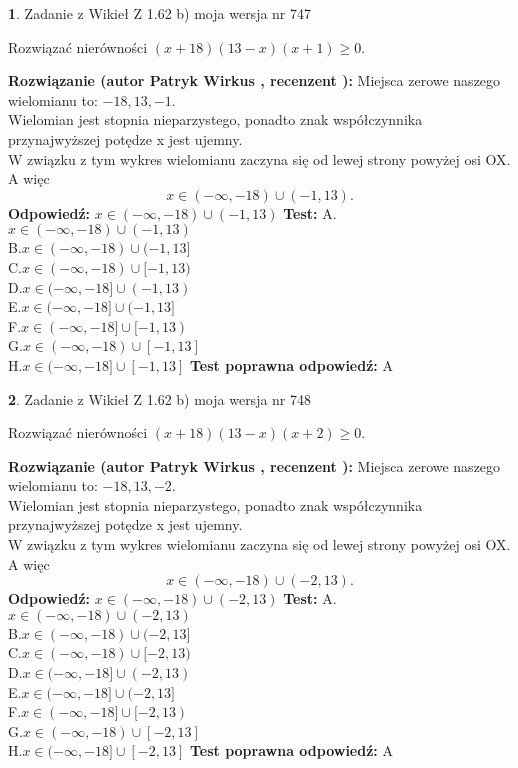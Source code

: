 \documentclass[12pt, a4paper]{article}
\theoremstyle{definition} %
\newtheorem{zad}{}
\newcommand{\zadStart}[1]{\begin{zad}#1\newline}
\newcommand{\zadStop}{\end{zad}}
\newcommand{\rozwStart}[2]{\noindent \textbf{Rozwiązanie (autor #1 , recenzent #2): }\newline}
\newcommand{\rozwStop}{\newline}
\newcommand{\odpStart}{\noindent \textbf{Odpowiedź:}\newline}
\newcommand{\odpStop}{\newline}
\newcommand{\testStart}{\noindent \textbf{Test:}\newline}
\newcommand{\testStop}{\newline}
\newcommand{\kluczStart}{\noindent \textbf{Test poprawna odpowiedź:}\newline}
\newcommand{\kluczStop}{\newline}
\begin{document}
\zadStart{Zadanie z Wikieł Z 1.62 b) moja wersja nr 747}

Rozwiązać nierówności $(x+18)(13-x)(x+1)\ge0$.
\zadStop
\rozwStart{Patryk Wirkus}{}
Miejsca zerowe naszego wielomianu to: $-18, 13, -1$.\\
Wielomian jest stopnia nieparzystego, ponadto znak współczynnika przy\linebreak najwyższej potędze x jest ujemny.\\ W związku z tym wykres wielomianu zaczyna się od lewej strony powyżej osi OX. A więc $$x \in (-\infty,-18) \cup (-1,13).$$
\rozwStop
\odpStart
$x \in (-\infty,-18) \cup (-1,13)$
\odpStop
\testStart
A.$x \in (-\infty,-18) \cup (-1,13)$\\
B.$x \in (-\infty,-18) \cup (-1,13]$\\
C.$x \in (-\infty,-18) \cup [-1,13)$\\
D.$x \in (-\infty,-18] \cup (-1,13)$\\
E.$x \in (-\infty,-18] \cup (-1,13]$\\
F.$x \in (-\infty,-18] \cup [-1,13)$\\
G.$x \in (-\infty,-18) \cup [-1,13]$\\
H.$x \in (-\infty,-18] \cup [-1,13]$
\testStop
\kluczStart
A
\kluczStop



\zadStart{Zadanie z Wikieł Z 1.62 b) moja wersja nr 748}

Rozwiązać nierówności $(x+18)(13-x)(x+2)\ge0$.
\zadStop
\rozwStart{Patryk Wirkus}{}
Miejsca zerowe naszego wielomianu to: $-18, 13, -2$.\\
Wielomian jest stopnia nieparzystego, ponadto znak współczynnika przy\linebreak najwyższej potędze x jest ujemny.\\ W związku z tym wykres wielomianu zaczyna się od lewej strony powyżej osi OX. A więc $$x \in (-\infty,-18) \cup (-2,13).$$
\rozwStop
\odpStart
$x \in (-\infty,-18) \cup (-2,13)$
\odpStop
\testStart
A.$x \in (-\infty,-18) \cup (-2,13)$\\
B.$x \in (-\infty,-18) \cup (-2,13]$\\
C.$x \in (-\infty,-18) \cup [-2,13)$\\
D.$x \in (-\infty,-18] \cup (-2,13)$\\
E.$x \in (-\infty,-18] \cup (-2,13]$\\
F.$x \in (-\infty,-18] \cup [-2,13)$\\
G.$x \in (-\infty,-18) \cup [-2,13]$\\
H.$x \in (-\infty,-18] \cup [-2,13]$
\testStop
\kluczStart
A
\kluczStop
\end{document}
